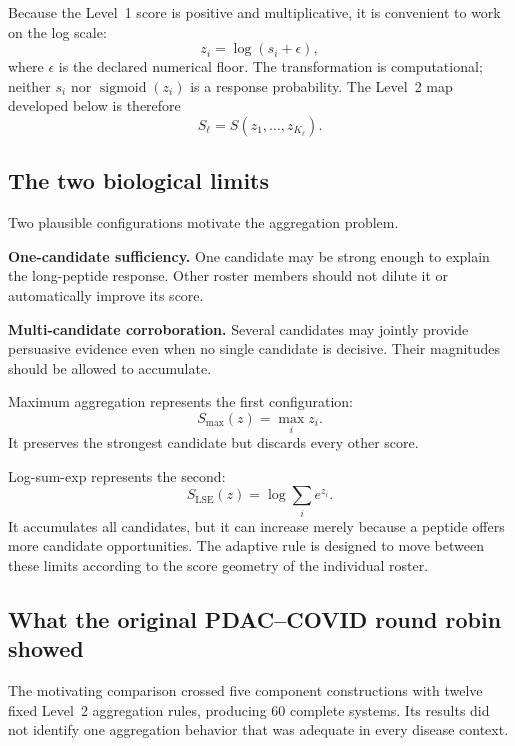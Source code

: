 \documentclass[11pt]{article}
\newcommand{\LSE}{\operatorname{LSE}}
\newcommand{\sigmoid}{\operatorname{sigmoid}}
\begin{document}
Because the Level~1 score is positive and multiplicative, it is convenient to
work on the log scale:
\begin{equation}
z_i=\log(s_i+\epsilon),
\end{equation}
where $\epsilon$ is the declared numerical floor. The transformation is
computational; neither $s_i$ nor $\sigmoid(z_i)$ is a response probability.
The Level~2 map developed below is therefore
\begin{equation}
S_\ell=S(z_1,\ldots,z_{K_\ell}).
\end{equation}

\subsection{The two biological limits}

Two plausible configurations motivate the aggregation problem.

\textbf{One-candidate sufficiency.}
One candidate may be strong enough to explain the long-peptide response.
Other roster members should not dilute it or automatically improve its score.

\textbf{Multi-candidate corroboration.}
Several candidates may jointly provide persuasive evidence even when no
single candidate is decisive. Their magnitudes should be allowed to
accumulate.

Maximum aggregation represents the first configuration:
\begin{equation}
S_{\max}(z)=\max_i z_i.
\end{equation}
It preserves the strongest candidate but discards every other score.

Log-sum-exp represents the second:
\begin{equation}
S_{\LSE}(z)=\log\sum_i e^{z_i}.
\end{equation}
It accumulates all candidates, but it can increase merely because a peptide
offers more candidate opportunities. The adaptive rule is designed to move
between these limits according to the score geometry of the individual
roster.

\subsection{What the original PDAC--COVID round robin showed}

The motivating comparison crossed five component constructions with twelve
fixed Level~2 aggregation rules, producing 60 complete systems. Its results
did not identify one aggregation behavior that was adequate in every disease
context.
\end{document}
